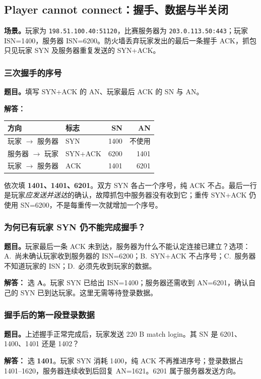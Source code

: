 \documentclass[11pt,a4paper,fontset=fandol]{ctexart}
\renewcommand{\exercisequestion}[2]{%
  \Needspace{5\baselineskip}%
  \subsubsection{#2}\label{exercise:#1}%
}
\renewenvironment{checkedsolution}
  {\par\nopagebreak[4]\textbf{解答：}\ignorespaces}
  {\par}
\begin{document}
\subsection{Player cannot connect：握手、数据与半关闭}

\textbf{场景。}玩家为 \texttt{198.51.100.40:51120}，比赛服务器为 \texttt{203.0.113.50:443}；玩家 ISN=1400，服务器 ISN=6200。防火墙丢弃玩家发出的最后一条握手 ACK，抓包只见玩家 SYN 及服务器重复发送的 SYN+ACK。

\exercisequestion{SC2008-HW04-Q10}{三次握手的序号}
\textbf{题目。}填写 SYN+ACK 的 AN、玩家最后 ACK 的 SN 与 AN。
\begin{checkedsolution}
\begin{center}
\small
\begin{tabular}{@{}llrr@{}}
\toprule
方向 & 标志 & SN & AN \\
\midrule
玩家 $\to$ 服务器 & SYN & 1400 & 不使用 \\
服务器 $\to$ 玩家 & SYN+ACK & 6200 & 1401 \\
玩家 $\to$ 服务器 & ACK & 1401 & 6201 \\
\bottomrule
\end{tabular}
\end{center}
依次填 \textbf{1401、1401、6201}。双方 SYN 各占一个序号，纯 ACK 不占。最后一行是玩家\emph{应发送并送达}的确认，故障抓包中服务器没有收到它；重传 SYN+ACK 仍使用 SN=6200，不是每重传一次就增加一个序号。
\end{checkedsolution}

\exercisequestion{SC2008-HW04-Q11}{为何已有玩家 SYN 仍不能完成握手？}
\textbf{题目。}玩家最后一条 ACK 未到达，服务器为什么不能认定连接已建立？选项：A.~尚未确认玩家收到服务器的 ISN=6200；B.~SYN+ACK 不占序号；C.~服务器不知道玩家的 ISN；D.~必须先收到玩家的数据。
\begin{checkedsolution}
选 \textbf{A}。玩家 SYN 已给出 ISN=1400；服务器还需收到 AN=6201，确认自己的 SYN 已到达玩家。这里无需等待登录数据。
\end{checkedsolution}

\exercisequestion{SC2008-HW04-Q12}{握手后的第一段登录数据}
\textbf{题目。}上述握手正常完成后，玩家发送 220 B match login。其 SN 是 6201、1400、1401 还是 1402？
\begin{checkedsolution}
选 \textbf{1401}。玩家 SYN 消耗 1400，纯 ACK 不再推进序号；登录数据占 1401--1620，服务器连续收到后回复 AN=1621。6201 属于服务器发送方向。
\end{checkedsolution}
\end{document}
